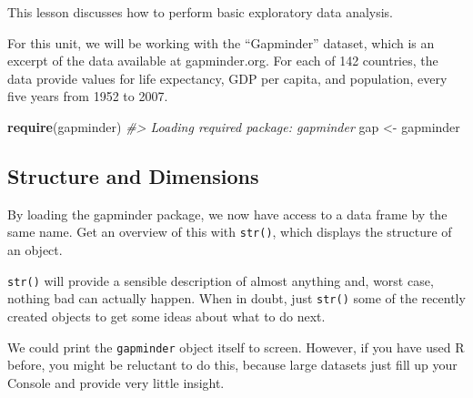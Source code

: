 \documentclass[]{book}
\newenvironment{Shaded}{\begin{snugshade}}{\end{snugshade}}
\newcommand{\KeywordTok}[1]{\textcolor[rgb]{0.13,0.29,0.53}{\textbf{#1}}}
\newcommand{\StringTok}[1]{\textcolor[rgb]{0.31,0.60,0.02}{#1}}
\newcommand{\CommentTok}[1]{\textcolor[rgb]{0.56,0.35,0.01}{\textit{#1}}}
\newcommand{\NormalTok}[1]{#1}
\begin{document}
This lesson discusses how to perform basic exploratory data analysis.

For this unit, we will be working with the ``Gapminder'' dataset, which
is an excerpt of the data available at gapminder.org. For each of 142
countries, the data provide values for life expectancy, GDP per capita,
and population, every five years from 1952 to 2007.

\begin{Shaded}
\begin{Highlighting}[]
\KeywordTok{require}\NormalTok{(gapminder)}
\CommentTok{#> Loading required package: gapminder}
\NormalTok{gap <-}\StringTok{ }\NormalTok{gapminder}
\end{Highlighting}
\end{Shaded}

\subsection{Structure and Dimensions}\label{structure-and-dimensions}

By loading the gapminder package, we now have access to a data frame by
the same name. Get an overview of this with \texttt{str()}, which
displays the structure of an object.

\begin{Shaded}
\end{Shaded}

\texttt{str()} will provide a sensible description of almost anything
and, worst case, nothing bad can actually happen. When in doubt, just
\texttt{str()} some of the recently created objects to get some ideas
about what to do next.

We could print the \texttt{gapminder} object itself to screen. However,
if you have used R before, you might be reluctant to do this, because
large datasets just fill up your Console and provide very little
insight.
\end{document}

